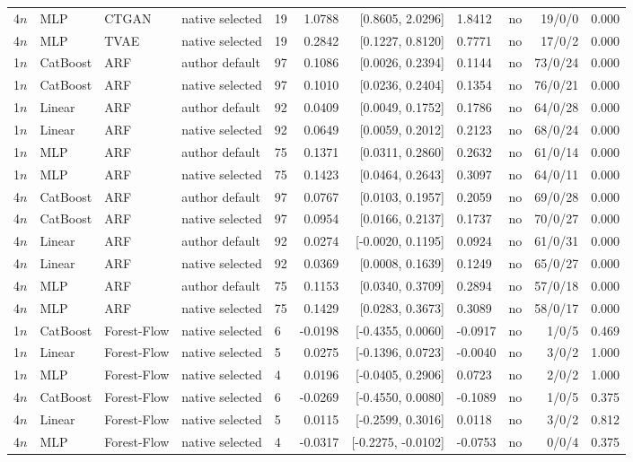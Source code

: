 \begin{longtable}{lllllrrllrl}
4$n$ & MLP & CTGAN & native selected & 19 & 1.0788 & [0.8605, 2.0296] & 1.8412 & no & 19/0/0 & 0.000 \\
4$n$ & MLP & TVAE & native selected & 19 & 0.2842 & [0.1227, 0.8120] & 0.7771 & no & 17/0/2 & 0.000 \\
1$n$ & CatBoost & ARF & author default & 97 & 0.1086 & [0.0026, 0.2394] & 0.1144 & no & 73/0/24 & 0.000 \\
1$n$ & CatBoost & ARF & native selected & 97 & 0.1010 & [0.0236, 0.2404] & 0.1354 & no & 76/0/21 & 0.000 \\
1$n$ & Linear & ARF & author default & 92 & 0.0409 & [0.0049, 0.1752] & 0.1786 & no & 64/0/28 & 0.000 \\
1$n$ & Linear & ARF & native selected & 92 & 0.0649 & [0.0059, 0.2012] & 0.2123 & no & 68/0/24 & 0.000 \\
1$n$ & MLP & ARF & author default & 75 & 0.1371 & [0.0311, 0.2860] & 0.2632 & no & 61/0/14 & 0.000 \\
1$n$ & MLP & ARF & native selected & 75 & 0.1423 & [0.0464, 0.2643] & 0.3097 & no & 64/0/11 & 0.000 \\
4$n$ & CatBoost & ARF & author default & 97 & 0.0767 & [0.0103, 0.1957] & 0.2059 & no & 69/0/28 & 0.000 \\
4$n$ & CatBoost & ARF & native selected & 97 & 0.0954 & [0.0166, 0.2137] & 0.1737 & no & 70/0/27 & 0.000 \\
4$n$ & Linear & ARF & author default & 92 & 0.0274 & [-0.0020, 0.1195] & 0.0924 & no & 61/0/31 & 0.000 \\
4$n$ & Linear & ARF & native selected & 92 & 0.0369 & [0.0008, 0.1639] & 0.1249 & no & 65/0/27 & 0.000 \\
4$n$ & MLP & ARF & author default & 75 & 0.1153 & [0.0340, 0.3709] & 0.2894 & no & 57/0/18 & 0.000 \\
4$n$ & MLP & ARF & native selected & 75 & 0.1429 & [0.0283, 0.3673] & 0.3089 & no & 58/0/17 & 0.000 \\
1$n$ & CatBoost & Forest-Flow & native selected & 6 & -0.0198 & [-0.4355, 0.0060] & -0.0917 & no & 1/0/5 & 0.469 \\
1$n$ & Linear & Forest-Flow & native selected & 5 & 0.0275 & [-0.1396, 0.0723] & -0.0040 & no & 3/0/2 & 1.000 \\
1$n$ & MLP & Forest-Flow & native selected & 4 & 0.0196 & [-0.0405, 0.2906] & 0.0723 & no & 2/0/2 & 1.000 \\
4$n$ & CatBoost & Forest-Flow & native selected & 6 & -0.0269 & [-0.4550, 0.0080] & -0.1089 & no & 1/0/5 & 0.375 \\
4$n$ & Linear & Forest-Flow & native selected & 5 & 0.0115 & [-0.2599, 0.3016] & 0.0118 & no & 3/0/2 & 0.812 \\
4$n$ & MLP & Forest-Flow & native selected & 4 & -0.0317 & [-0.2275, -0.0102] & -0.0753 & no & 0/0/4 & 0.375 \\
\bottomrule
\end{longtable}

